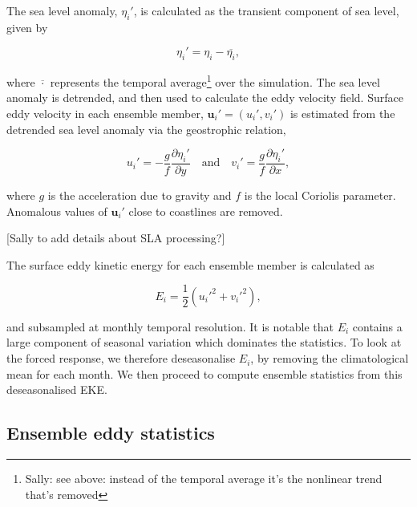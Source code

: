 \documentclass{agujournal2019}
\newcommand{\andycomment}[1]{{\color{blue} [#1]}}
\begin{document}
The sea level anomaly, $\eta_i'$, is calculated as the transient component of sea level, given by 
\begin{linenomath*}
\begin{equation}
\eta_i' = \eta_i - \overline{\eta_i},
\end{equation}
\end{linenomath*}
where $\overline{\cdot}$ represents the temporal average\footnote{{\color{blue}Sally: see above: instead of the temporal average it's the nonlinear trend that's removed}} over the simulation.
The sea level anomaly is detrended, and then used to calculate the eddy velocity field.
Surface eddy velocity in each ensemble member, $\mathbf{u}_i' = (u_i', v_i')$ is estimated from the detrended sea level anomaly via the geostrophic relation,
\begin{linenomath*}
\begin{equation}
u_i' = - \frac{g}{f} \frac{\partial \eta_i'}{\partial y} \quad \text{and} \quad v_i' = \frac{g}{f} \frac{\partial \eta_i'}{\partial x},
\end{equation}
\end{linenomath*}
where $g$ is the acceleration due to gravity and $f$ is the local Coriolis parameter.
Anomalous values of $\mathbf{u}_i'$ close to coastlines are removed.

\andycomment{Sally to add details about SLA processing?}

The surface eddy kinetic energy for each ensemble member is calculated as 
\begin{linenomath*}
\begin{equation}
E_i = \frac{1}{2}(u_i'^2 + v_i'^2),
\end{equation}
\end{linenomath*}
and subsampled at monthly temporal resolution.
It is notable that $E_i$ contains a large component of seasonal variation \citep{Martinez-Moreno2021} which dominates the statistics.
To look at the forced response, we therefore deseasonalise $E_i$, by removing the climatological mean for each month.
We then proceed to compute ensemble statistics from this deseasonalised EKE.

\subsection{Ensemble eddy statistics}
\end{document}
